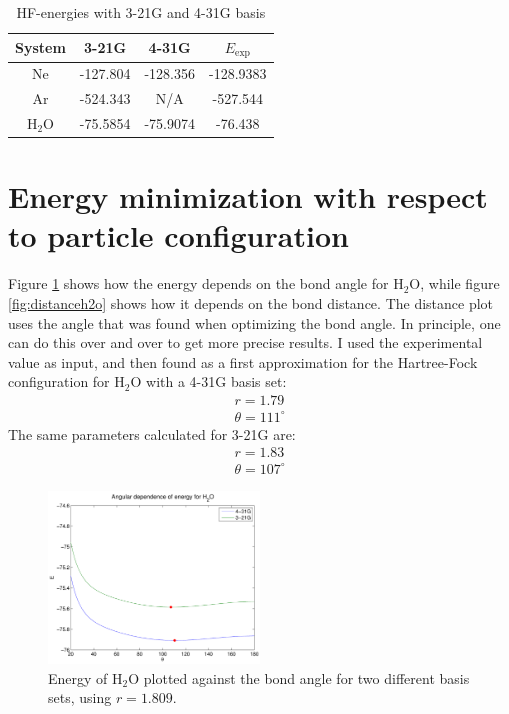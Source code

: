 \documentclass[a4paper,10pt, twocolumn, pre]{revtex4}
\begin{document}
\begin{table}[h!tb]
\caption{HF-energies with 3-21G and 4-31G basis}
\label{tb:energy321g431g}
\begin{tabular}[c]{c|c|c|c}
System & 3-21G & 4-31G & $E_{\mbox{exp}}$ \\
\hline
Ne & -127.804 & -128.356 & -128.9383 \\
Ar & -524.343 & N/A & -527.544 \\
$\mbox{H}_2\mbox{O}$ & -75.5854 & -75.9074 & -76.438 \\
\end{tabular}
\end{table}

\section{Energy minimization with respect to particle configuration}
Figure \ref{fig:eangularh2o} shows how the energy depends on the bond angle for H$_2$O, while figure \ref{fig:distanceh2o} shows how it depends on the bond distance. The distance plot uses the angle that was found when optimizing the bond angle. In principle, one can do this over and over to get more precise results. I used the experimental value as input, and then found as a first approximation for the Hartree-Fock configuration for H$_2$O with a 4-31G basis set:
\begin{align}
r = 1.79 \\
\theta = 111^{\circ}
\end{align}
The same parameters calculated for 3-21G are:
\begin{align}
r =  1.83\\
\theta = 107^{\circ}
\end{align}
\begin{figure}
\includegraphics[width=0.5\textwidth]{figures/H2O_angular_energy.pdf}
\caption{Energy of H$_2$O plotted against the bond angle for two different basis sets, using $r=1.809$.}
\label{fig:eangularh2o}
\end{figure}
\end{document}
